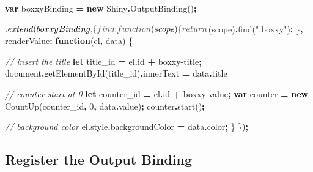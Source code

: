 \documentclass[
]{krantz}
\makeatletter
\newenvironment{Shaded}{\begin{snugshade}}{\end{snugshade}}
\newcommand{\AttributeTok}[1]{\textcolor[rgb]{0.61,0.61,0.61}{#1}}
\newcommand{\BuiltInTok}[1]{#1}
\newcommand{\CommentTok}[1]{\textcolor[rgb]{0.37,0.37,0.37}{\textit{#1}}}
\newcommand{\ControlFlowTok}[1]{\textcolor[rgb]{0.27,0.27,0.27}{\textbf{#1}}}
\newcommand{\DataTypeTok}[1]{\textcolor[rgb]{0.27,0.27,0.27}{#1}}
\newcommand{\DecValTok}[1]{\textcolor[rgb]{0.06,0.06,0.06}{#1}}
\newcommand{\FunctionTok}[1]{\textcolor[rgb]{0,0,0}{#1}}
\newcommand{\KeywordTok}[1]{\textcolor[rgb]{0.27,0.27,0.27}{\textbf{#1}}}
\newcommand{\NormalTok}[1]{#1}
\newcommand{\OperatorTok}[1]{\textcolor[rgb]{0.43,0.43,0.43}{\textbf{#1}}}
\newcommand{\StringTok}[1]{\textcolor[rgb]{0.5,0.5,0.5}{#1}}
\newenvironment{kframe}{%
\medskip{}
\setlength{\fboxsep}{.8em}
 \def\at@end@of@kframe{}%
 \ifinner\ifhmode%
  \def\at@end@of@kframe{\end{minipage}}%
  \begin{minipage}{\columnwidth}%
 \fi\fi%
 \def\FrameCommand##1{\hskip\@totalleftmargin \hskip-\fboxsep
 \colorbox{shadecolor}{##1}\hskip-\fboxsep
     \hskip-\linewidth \hskip-\@totalleftmargin \hskip\columnwidth}%
 \MakeFramed {\advance\hsize-\width
   \@totalleftmargin\z@ \linewidth\hsize
   \@setminipage}}%
 {\par\unskip\endMakeFramed%
 \at@end@of@kframe}
\renewenvironment{Shaded}{\begin{kframe}}{\end{kframe}}
\makeatother
\begin{document}
\begin{Shaded}
\begin{Highlighting}[]
\KeywordTok{var}\NormalTok{ boxxyBinding }\OperatorTok{=} \KeywordTok{new}\NormalTok{ Shiny}\OperatorTok{.}\FunctionTok{OutputBinding}\NormalTok{()}\OperatorTok{;}

\NormalTok{$}\OperatorTok{.}\FunctionTok{extend}\NormalTok{(boxxyBinding}\OperatorTok{,}\NormalTok{ \{}
  \DataTypeTok{find}\OperatorTok{:} \KeywordTok{function}\NormalTok{(scope) \{}
    \ControlFlowTok{return}\NormalTok{ $(scope)}\OperatorTok{.}\FunctionTok{find}\NormalTok{(}\StringTok{".boxxy"}\NormalTok{)}\OperatorTok{;}
\NormalTok{  \}}\OperatorTok{,}
  \DataTypeTok{renderValue}\OperatorTok{:} \KeywordTok{function}\NormalTok{(el}\OperatorTok{,}\NormalTok{ data) \{}

    \CommentTok{// insert the title}
    \KeywordTok{let}\NormalTok{ title\_id }\OperatorTok{=}\NormalTok{ el}\OperatorTok{.}\AttributeTok{id} \OperatorTok{+} \StringTok{\textquotesingle{}{-}boxxy{-}title\textquotesingle{}}\OperatorTok{;}
    \BuiltInTok{document}\OperatorTok{.}\FunctionTok{getElementById}\NormalTok{(title\_id)}\OperatorTok{.}\AttributeTok{innerText} \OperatorTok{=}\NormalTok{ data}\OperatorTok{.}\AttributeTok{title}

    \CommentTok{// counter start at 0}
    \KeywordTok{let}\NormalTok{ counter\_id }\OperatorTok{=}\NormalTok{ el}\OperatorTok{.}\AttributeTok{id} \OperatorTok{+} \StringTok{\textquotesingle{}{-}boxxy{-}value\textquotesingle{}}\OperatorTok{;}
    \KeywordTok{var}\NormalTok{ counter }\OperatorTok{=} \KeywordTok{new}\NormalTok{ CountUp(counter\_id}\OperatorTok{,} \DecValTok{0}\OperatorTok{,}\NormalTok{ data}\OperatorTok{.}\AttributeTok{value}\NormalTok{)}\OperatorTok{;}
\NormalTok{    counter}\OperatorTok{.}\FunctionTok{start}\NormalTok{()}\OperatorTok{;}

    \CommentTok{// background color }
\NormalTok{    el}\OperatorTok{.}\AttributeTok{style}\OperatorTok{.}\AttributeTok{backgroundColor} \OperatorTok{=}\NormalTok{ data}\OperatorTok{.}\AttributeTok{color}\OperatorTok{;}
\NormalTok{  \}}
\NormalTok{\})}\OperatorTok{;}
\end{Highlighting}
\end{Shaded}

\hypertarget{shiny-output-register}{%
\subsection{Register the Output Binding}\label{shiny-output-register}}
\end{document}
